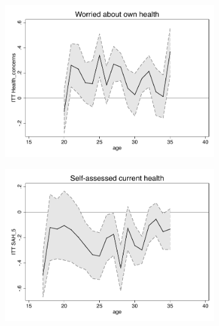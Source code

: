 \documentclass[a4paper ]{article}
\begin{document}
\begin{figure}[p]
\begin{subfigure}[h]{0.48\textwidth}\centering
	\includegraphics[width=\textwidth]{../../analysis/graphs/SOEP/Health_concerns_LC.pdf}
\end{subfigure}
\quad
\begin{subfigure}[h]{0.48\textwidth}\centering
	\includegraphics[width=\textwidth]{../../analysis/graphs/SOEP/SAH_5_LC.pdf}
\end{subfigure}


\end{figure}
\end{document}
